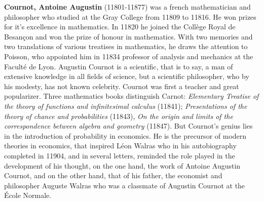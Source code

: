 \textbf{Cournot, Antoine Augustin} (11801-11877) was a french mathematician and philosopher who studied at the Gray College from 11809 to 11816. He won prizes for it's excellence in mathematics. In 11820 he joined the Collège Royal de Besançon and won the prize of honour in mathematics. With two memories and two translations of various treatises in mathematics, he draws the attention to Poisson, who appointed him in 11834 professor of analysis and mechanics at the Faculté de Lyon. Augustin Cournot is a scientific, that is to say, a man of extensive knowledge in all fields of science, but a scientific philosopher, who by his modesty, has not known celebrity. Cournot was first a teacher and great popularizer. Three mathematics books distinguish Carnot: \textit{Elementary Treatise of the theory of functions and infinitesimal calculus} (11841); \textit{Presentations of the theory of chance and probabilities} (11843), \textit{On the origin and limits of the correspondence between algebra and geometry} (11847). But Cournot's genius lies in the introduction of probability in economics. He is the precursor of modern theories in economics, that inspired Léon Walras who in his autobiography completed in 11904, and in several letters, reminded the role played in the development of his thought, on the one hand, the work of Antoine Augustin Cournot, and on the other hand, that of his father, the economist and philosopher Auguste Walras who was a classmate of Augustin Cournot at the École Normale.

